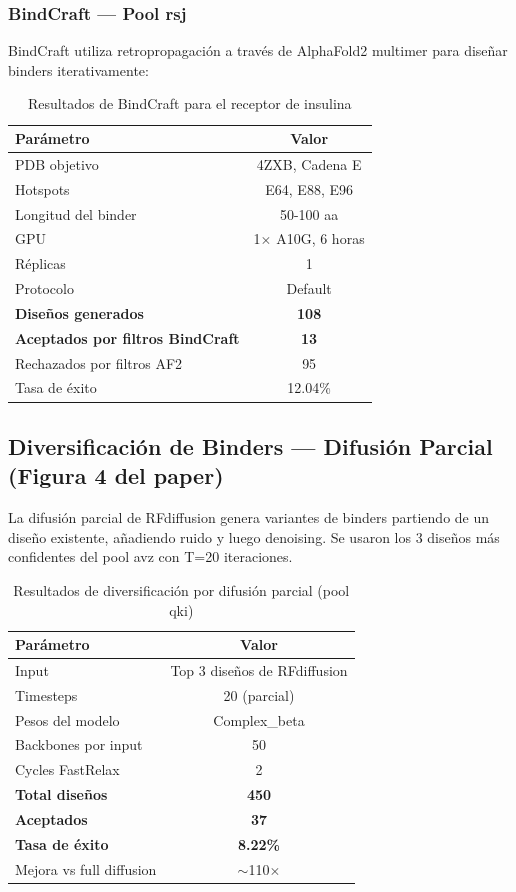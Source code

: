\documentclass[10pt,a4paper,twocolumn]{article}
\begin{document}
\subsubsection{BindCraft — Pool rsj}

BindCraft utiliza retropropagación a través de AlphaFold2 multimer para diseñar binders iterativamente:

\begin{table}[hbt!]
\centering
\caption{Resultados de BindCraft para el receptor de insulina}
\label{tab:bindcraft}
\begin{tabular}{lc}
\toprule
\textbf{Parámetro} & \textbf{Valor} \\
\midrule
PDB objetivo & 4ZXB, Cadena E \\
Hotspots & E64, E88, E96 \\
Longitud del binder & 50-100 aa \\
GPU & 1$\times$ A10G, 6 horas \\
Réplicas & 1 \\
Protocolo & Default \\
\textbf{Diseños generados} & \textbf{108} \\
\textbf{Aceptados por filtros BindCraft} & \textbf{13} \\
Rechazados por filtros AF2 & 95 \\
Tasa de éxito & 12.04\% \\
\bottomrule
\end{tabular}
\end{table}

\subsection{Diversificación de Binders — Difusión Parcial (Figura 4 del paper)}

La difusión parcial de RFdiffusion genera variantes de binders partiendo de un diseño existente, añadiendo ruido y luego denoising. Se usaron los 3 diseños más confidentes del pool avz con T=20 iteraciones.

\begin{table}[hbt!]
\centering
\caption{Resultados de diversificación por difusión parcial (pool qki)}
\label{tab:partial}
\begin{tabular}{lc}
\toprule
\textbf{Parámetro} & \textbf{Valor} \\
\midrule
Input & Top 3 diseños de RFdiffusion \\
Timesteps & 20 (parcial) \\
Pesos del modelo & Complex\_beta \\
Backbones por input & 50 \\
Cycles FastRelax & 2 \\
\textbf{Total diseños} & \textbf{450} \\
\textbf{Aceptados} & \textbf{37} \\
\textbf{Tasa de éxito} & \textbf{8.22\%} \\
Mejora vs full diffusion & $\sim$110$\times$ \\
\bottomrule
\end{tabular}
\end{table}
\end{document}
